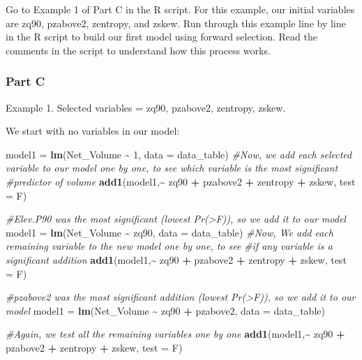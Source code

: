 \documentclass[
]{book}
\newenvironment{Shaded}{\begin{snugshade}}{\end{snugshade}}
\newcommand{\AttributeTok}[1]{\textcolor[rgb]{0.13,0.29,0.53}{#1}}
\newcommand{\CommentTok}[1]{\textcolor[rgb]{0.56,0.35,0.01}{\textit{#1}}}
\newcommand{\DecValTok}[1]{\textcolor[rgb]{0.00,0.00,0.81}{#1}}
\newcommand{\FunctionTok}[1]{\textcolor[rgb]{0.13,0.29,0.53}{\textbf{#1}}}
\newcommand{\NormalTok}[1]{#1}
\newcommand{\OtherTok}[1]{\textcolor[rgb]{0.56,0.35,0.01}{#1}}
\newcommand{\SpecialCharTok}[1]{\textcolor[rgb]{0.81,0.36,0.00}{\textbf{#1}}}
\newcommand{\StringTok}[1]{\textcolor[rgb]{0.31,0.60,0.02}{#1}}
\begin{document}
Go to Example 1 of Part C in the R script. For this example, our initial variables are zq90, pzabove2, zentropy, and zskew. Run through this example line by line in the R script to build our first model using forward selection. Read the comments in the script to understand how this process works.

\hypertarget{part-c}{%
\subsubsection*{Part C}\label{part-c}}

Example 1. Selected variables = zq90, pzabove2, zentropy, zskew.

We start with no variables in our model:

\begin{Shaded}
\begin{Highlighting}[]
\NormalTok{model1 }\OtherTok{=} \FunctionTok{lm}\NormalTok{(Net\_Volume }\SpecialCharTok{\textasciitilde{}} \DecValTok{1}\NormalTok{, }\AttributeTok{data =}\NormalTok{ data\_table)}
\CommentTok{\#Now, we add each selected variable to our model one by one, to see which variable is the most significant}
\CommentTok{\#predictor of volume}
\FunctionTok{add1}\NormalTok{(model1,}\SpecialCharTok{\textasciitilde{}}\NormalTok{  zq90 }\SpecialCharTok{+}\NormalTok{ pzabove2 }\SpecialCharTok{+}\NormalTok{ zentropy }\SpecialCharTok{+}\NormalTok{ zskew, }\AttributeTok{test =} \StringTok{\textquotesingle{}F\textquotesingle{}}\NormalTok{)}

\CommentTok{\#Elev.P90 was the most significant (lowest Pr(\textgreater{}F)), so we add it to our model}
\NormalTok{model1 }\OtherTok{=} \FunctionTok{lm}\NormalTok{(Net\_Volume }\SpecialCharTok{\textasciitilde{}}\NormalTok{ zq90, }\AttributeTok{data =}\NormalTok{ data\_table)}
\CommentTok{\#Now, We add each remaining variable to the new model one by one, to see }
\CommentTok{\#if any variable is a significant addition}
\FunctionTok{add1}\NormalTok{(model1,}\SpecialCharTok{\textasciitilde{}}\NormalTok{  zq90 }\SpecialCharTok{+}\NormalTok{ pzabove2 }\SpecialCharTok{+}\NormalTok{ zentropy }\SpecialCharTok{+}\NormalTok{ zskew, }\AttributeTok{test =} \StringTok{\textquotesingle{}F\textquotesingle{}}\NormalTok{)}

\CommentTok{\#pzabove2 was the most significant addition (lowest Pr(\textgreater{}F)), so we add it to our model}
\NormalTok{model1 }\OtherTok{=} \FunctionTok{lm}\NormalTok{(Net\_Volume }\SpecialCharTok{\textasciitilde{}}\NormalTok{ zq90 }\SpecialCharTok{+}\NormalTok{ pzabove2, }\AttributeTok{data =}\NormalTok{ data\_table)}

\CommentTok{\#Again, we test all the remaining variables one by one}
\FunctionTok{add1}\NormalTok{(model1,}\SpecialCharTok{\textasciitilde{}}\NormalTok{ zq90 }\SpecialCharTok{+}\NormalTok{ pzabove2 }\SpecialCharTok{+}\NormalTok{ zentropy }\SpecialCharTok{+}\NormalTok{ zskew, }\AttributeTok{test =} \StringTok{\textquotesingle{}F\textquotesingle{}}\NormalTok{)}
\end{Highlighting}
\end{Shaded}
\end{document}
